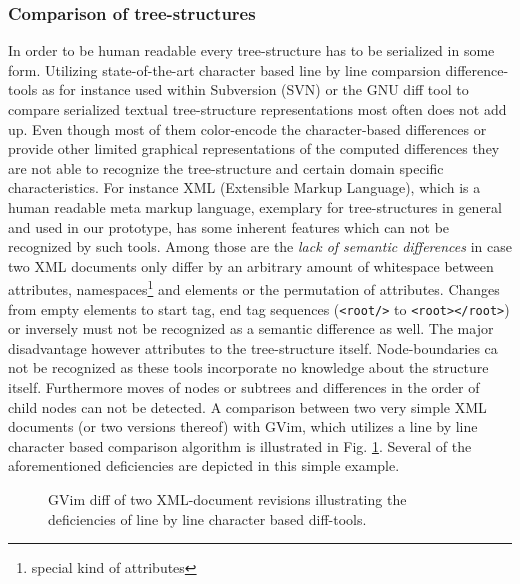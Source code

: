 \subsubsection{Comparison of tree-structures}
In order to be human readable every tree-structure has to be serialized in some form. Utilizing state-of-the-art character based line by line comparsion difference-tools as for instance used within Subversion (SVN\cite{SUBVERSION}) or the GNU diff tool to compare serialized textual tree-structure representations most often does not add up. Even though most of them color-encode the character-based differences or provide other limited graphical representations of the computed differences they are not able to recognize the tree-structure and certain domain specific characteristics. For instance XML (Extensible Markup Language), which is a human readable meta markup language, exemplary for tree-structures in general and used in our prototype, has some inherent features which can not be recognized by such tools. Among those are the \emph{lack of semantic differences} in case two XML documents only differ by an arbitrary amount of whitespace between attributes, namespaces\footnote{special kind of attributes} and elements or the permutation of attributes. Changes from empty elements to start tag, end tag sequences (\texttt{<root/>} to \texttt{<root></root>}) or inversely must not be recognized as a semantic difference as well. The major disadvantage however attributes to the tree-structure itself. Node-boundaries ca not be recognized as these tools incorporate no knowledge about the structure itself. Furthermore moves of nodes or subtrees and differences in the order of child nodes can not be detected. A comparison between two very simple XML documents (or two versions thereof) with GVim, which utilizes a line by line character based comparison algorithm is illustrated in Fig. \ref{fig:faileddiff}. Several of the aforementioned deficiencies are depicted in this simple example. 

\begin{figure}[tb]
\caption{\label{fig:faileddiff} GVim diff of two XML-document revisions illustrating the deficiencies of line by line character based diff-tools.}
\end{figure}

